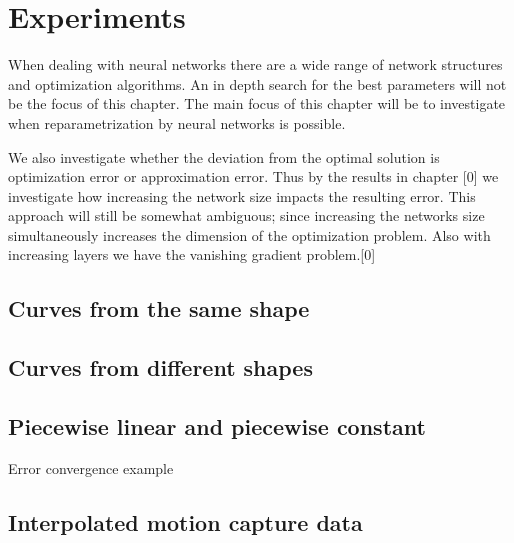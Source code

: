 
\section{Experiments}
\FloatBarrier
When dealing with neural networks there are a wide range of network structures and optimization algorithms. An in depth search for the best parameters will not be the focus of this chapter. The main focus of this chapter will be to investigate when reparametrization by neural networks is possible.

We also investigate whether the deviation from the optimal solution is optimization error or approximation error.  Thus by the results in chapter [0] we investigate how increasing the network size impacts the resulting error. This approach will still be somewhat ambiguous; since increasing the networks size simultaneously increases the dimension of the optimization problem. Also with increasing layers we have the vanishing gradient problem.[0]

\subsection{Curves from the same shape}
\FloatBarrier


\FloatBarrier
\subsection{Curves from different shapes}


\FloatBarrier
\subsection{Piecewise linear and piecewise constant}

Error convergence example 

\FloatBarrier
\subsection{Interpolated motion capture data}

